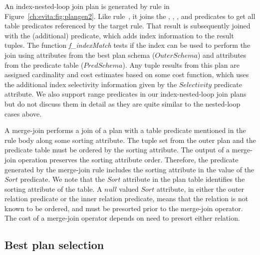 An index-nested-loop join plan is generated by rule  in
Figure~\ref{ch:evita:fig:plangen2}.  Like rule~, it joins the
, , , and  predicates to
get all table predicates referenced by the target rule.  That result is
subsequently joined with the (additional)  predicate, which adds
index information to the result tuples.  The function {\em f\_indexMatch} tests
if the index can be used to perform the join using attributes from the best
plan schema ($OuterSchema$) and attributes from the predicate table
($PredSchema$).  Any tuple results from this plan are assigned cardinality and
cost estimates based on some cost function, which uses the additional index
selectivity information given by the $Selectivity$  predicate
attribute.  We also support range predicates in our index-nested-loop join
plans but do not discuss them in detail as they are quite similar to the
nested-loop cases above.

A merge-join performs a join of a plan with a table predicate mentioned in the
rule body along some sorting attribute.  The tuple set from the outer plan and
the predicate table must be ordered by the sorting attribute.  The output of a
merge-join operation preserves the sorting attribute order.  Therefore, the
 predicate generated by the merge-join rule includes the sorting
attribute in the value of the $Sort$  predicate.  We note that the
$Sort$ attribute in the  plan table identifies the sorting attribute
of the table.  A $null$ valued $Sort$ attribute, in either the outer relation
 predicate or the inner relation  predicate, means that the
relation is not known to be ordered, and must be presorted prior to the
merge-join operator.  The cost of a merge-join operator depends on need to
presort either relation.

\subsection{Best plan selection}
\label{ch:evita:sec:bestplan}

